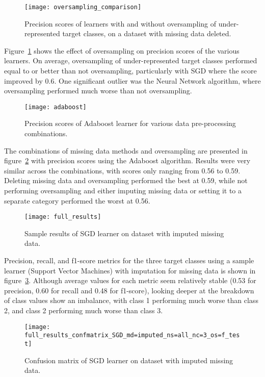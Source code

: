 \documentclass[conference]{IEEEtran}
\begin{document}
\begin{figure}[htpb]
	\centering
	\texttt{[image: oversampling\_comparison]}
	\caption{Precision scores of learners with and without oversampling of under-represented target classes, on a dataset with missing data deleted.}
	\label{fig:oversampling_comp}
\end{figure}

Figure~\ref{fig:oversampling_comp} shows the effect of oversampling on precision scores of the various learners. On average, oversampling of under-represented target classes performed equal to or better than not oversampling, particularly with SGD where the score improved by 0.6. One significant outlier was the Neural Network algorithm, where oversampling performed much worse than not oversampling.

\begin{figure}[htpb]
	\centering
	\texttt{[image: adaboost]}
	\caption{Precision scores of Adaboost learner for various data pre-processing combinations.}
	\label{fig:adaboost}
\end{figure}

The combinations of missing data methods and oversampling are presented in figure~\ref{fig:adaboost} with precision scores using the Adaboost algorithm. Results were very similar across the combinations, with scores only ranging from 0.56 to 0.59. Deleting missing data and oversampling performed the best at 0.59, while not performing oversampling and either imputing missing data or setting it to a separate category performed the worst at 0.56.

\begin{figure}[htpb]
	\centering
	\texttt{[image: full\_results]}
	\caption{Sample results of SGD learner on dataset with imputed missing data.}
	\label{fig:full_results}
\end{figure}

Precision, recall, and f1-score metrics for the three target classes using a sample learner (Support Vector Machines) with imputation for missing data is shown in figure~\ref{fig:full_results}. Although average values for each metric seem relatively stable (0.53 for precision, 0.60 for recall and 0.48 for f1-score), looking deeper at the breakdown of class values show an imbalance, with class 1 performing much worse than class 2, and class 2 performing much worse than class 3.

\begin{figure}[htpb]
	\centering
	\texttt{[image: full\_results\_confmatrix\_SGD\_md=imputed\_ns=all\_nc=3\_os=f\_test]}
	\caption{Confusion matrix of SGD learner on dataset with imputed missing data.}
	\label{fig:full_results_cm}
\end{figure}
\end{document}
